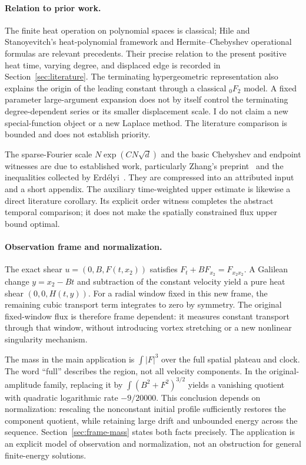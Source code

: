 \documentclass[11pt]{article}
\theoremstyle{definition}
\begin{document}
\paragraph{Relation to prior work.}
The finite heat operation on polynomial spaces is classical;
Hile and Stanoyevitch's heat-polynomial framework and Hermite--Chebyshev
operational formulas are relevant precedents. Their precise relation to
the present positive heat time, varying degree, and displaced edge is
recorded in Section~\ref{sec:literature}.
The terminating hypergeometric representation also explains the origin
of the leading constant through a classical ${}_0F_2$ model. A fixed
parameter large-argument expansion does not by itself control the
terminating degree-dependent series or its smaller displacement scale.
I do not claim a new special-function object or a new Laplace method.
The literature comparison is bounded and does not establish priority.

The sparse-Fourier scale $N\exp(CN\sqrt d)$ and the basic Chebyshev
and endpoint witnesses are due to established work, particularly
Zhang's preprint~\cite{Zhang2026} and the inequalities collected by
Erd\'elyi~\cite{Erdelyi2017}. They are compressed into an attributed
input and a short appendix. The auxiliary time-weighted upper estimate
is likewise a direct literature corollary. Its explicit order witness
completes the abstract temporal comparison; it does not make the
spatially constrained flux upper bound optimal.

\paragraph{Observation frame and normalization.}
The exact shear $u=(0,B,F(t,x_2))$ satisfies
$F_t+BF_{x_2}=F_{x_2x_2}$. A Galilean change
$y=x_2-Bt$ and subtraction of the constant velocity yield a pure heat
shear $(0,0,H(t,y))$. For a radial window fixed in this new frame,
the remaining cubic transport term integrates to zero by symmetry.
The original fixed-window flux is therefore frame dependent: it
measures constant transport through that window, without introducing
vortex stretching or a new nonlinear singularity mechanism.

The mass in the main application is $\int|F|^3$ over the full spatial
plateau and clock. The word ``full'' describes the region, not all
velocity components. In the original-amplitude family, replacing it by
$\int(B^2+F^2)^{3/2}$ yields a vanishing quotient with quadratic
logarithmic rate $-9/20000$. This conclusion depends on normalization:
rescaling the nonconstant initial profile sufficiently restores the
component quotient, while retaining large drift and unbounded energy
across the sequence. Section~\ref{sec:frame-mass} states both facts
precisely. The application is an explicit model of observation and
normalization, not an obstruction for general finite-energy solutions.
\end{document}

